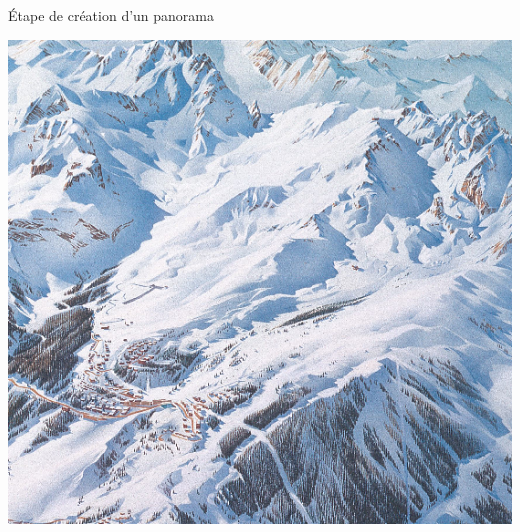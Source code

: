 \documentclass{beamer}
\begin{document}
\begin{frame}[noframenumbering]{Étape de création d'un panorama}
\begin{center}
\begin{minipage}[c]{0.45\linewidth}
\begin{center}
    	\includegraphics[width=1.0\linewidth]{Images/courchevel.png}
    \end{center}
    \end{minipage}

\end{center}
\end{frame}
\end{document}
